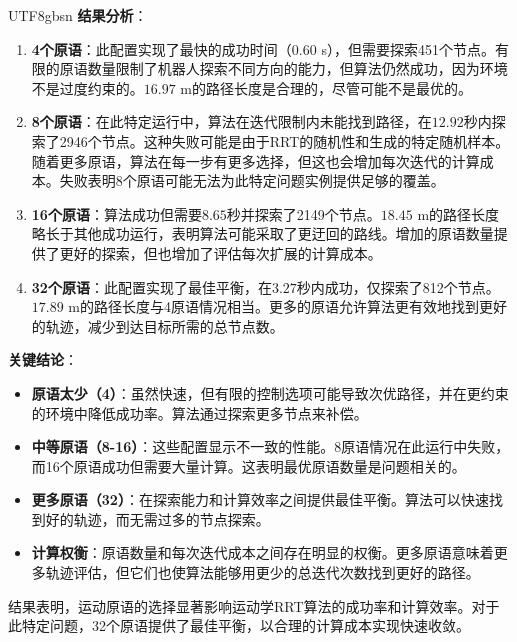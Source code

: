 \documentclass[11pt]{article}
\begin{document}
\begin{CJK}{UTF8}{gbsn}
\textbf{结果分析}：

\begin{enumerate}
    \item \textbf{4个原语}：此配置实现了最快的成功时间（$0.60$ s），但需要探索451个节点。有限的原语数量限制了机器人探索不同方向的能力，但算法仍然成功，因为环境不是过度约束的。$16.97$ m的路径长度是合理的，尽管可能不是最优的。

    \item \textbf{8个原语}：在此特定运行中，算法在迭代限制内未能找到路径，在$12.92$秒内探索了2946个节点。这种失败可能是由于RRT的随机性和生成的特定随机样本。随着更多原语，算法在每一步有更多选择，但这也会增加每次迭代的计算成本。失败表明8个原语可能无法为此特定问题实例提供足够的覆盖。

    \item \textbf{16个原语}：算法成功但需要$8.65$秒并探索了2149个节点。$18.45$ m的路径长度略长于其他成功运行，表明算法可能采取了更迂回的路线。增加的原语数量提供了更好的探索，但也增加了评估每次扩展的计算成本。

    \item \textbf{32个原语}：此配置实现了最佳平衡，在$3.27$秒内成功，仅探索了812个节点。$17.89$ m的路径长度与4原语情况相当。更多的原语允许算法更有效地找到更好的轨迹，减少到达目标所需的总节点数。
\end{enumerate}

\textbf{关键结论}：

\begin{itemize}
    \item \textbf{原语太少（4）}：虽然快速，但有限的控制选项可能导致次优路径，并在更约束的环境中降低成功率。算法通过探索更多节点来补偿。

    \item \textbf{中等原语（8-16）}：这些配置显示不一致的性能。8原语情况在此运行中失败，而16个原语成功但需要大量计算。这表明最优原语数量是问题相关的。

    \item \textbf{更多原语（32）}：在探索能力和计算效率之间提供最佳平衡。算法可以快速找到好的轨迹，而无需过多的节点探索。

    \item \textbf{计算权衡}：原语数量和每次迭代成本之间存在明显的权衡。更多原语意味着更多轨迹评估，但它们也使算法能够用更少的总迭代次数找到更好的路径。
\end{itemize}

结果表明，运动原语的选择显著影响运动学RRT算法的成功率和计算效率。对于此特定问题，32个原语提供了最佳平衡，以合理的计算成本实现快速收敛。


\end{CJK}
\end{document}

